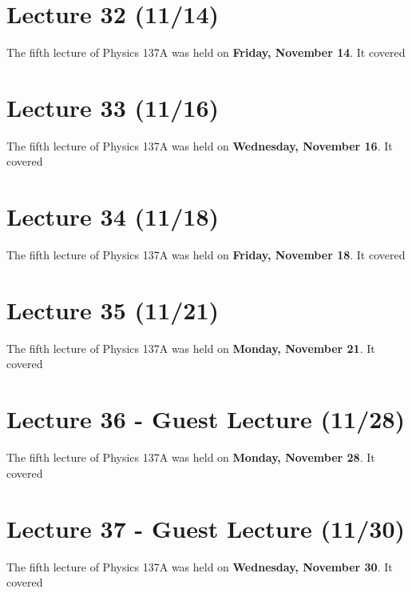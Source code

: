 \documentclass{book}
\theoremstyle{plain}
\begin{document}
      \chapter{Lecture 32 (11/14)}
        The fifth lecture of Physics 137A was held on \textbf{Friday, November 14}. It covered
        
      \chapter{Lecture 33 (11/16)}
        The fifth lecture of Physics 137A was held on \textbf{Wednesday, November 16}. It covered
        
      \chapter{Lecture 34 (11/18)}
        The fifth lecture of Physics 137A was held on \textbf{Friday, November 18}. It covered
        
      \chapter{Lecture 35 (11/21)}
        The fifth lecture of Physics 137A was held on \textbf{Monday, November 21}. It covered
        
      \chapter{Lecture 36 - Guest Lecture (11/28)}
        The fifth lecture of Physics 137A was held on \textbf{Monday, November 28}. It covered
        
      \chapter{Lecture 37 - Guest Lecture (11/30)}
        The fifth lecture of Physics 137A was held on \textbf{Wednesday, November 30}. It covered
        
\end{document}
